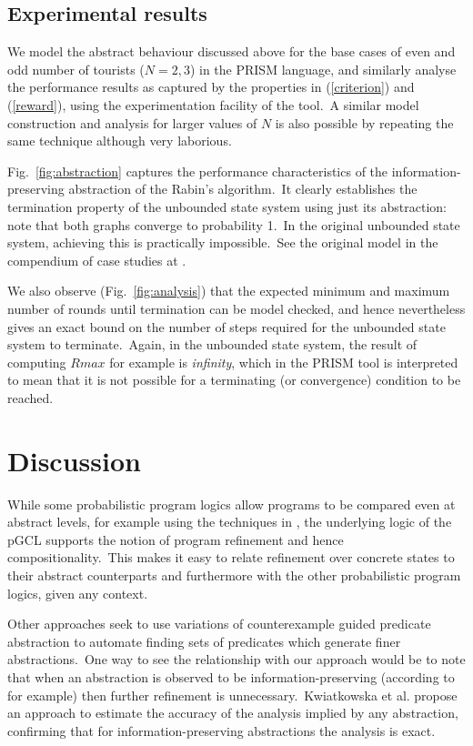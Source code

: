 \documentclass[numbers,copyright,creativecommons]{eptcs}
\newcommand{\figg}[1]{Fig.~\ref{#1}}
\begin{document}
\subsection{Experimental results}
We model the abstract behaviour discussed above for the base cases of even and odd number of tourists ($N = 2,3$) in the PRISM language, and similarly analyse the performance results as captured by the properties in (\ref{criterion}) and (\ref{reward}), using the experimentation facility of the tool.\ A similar model construction and analysis for larger values of $N$ is also possible by repeating the same technique although very laborious.

\figg{fig:abstraction} captures the performance characteristics of the information-preserving abstraction of the Rabin's algorithm.\ It clearly establishes the termination property of the unbounded state system using just its abstraction: note that both graphs converge to probability 1.\ In the original unbounded state system, achieving this is practically impossible.\ See the original model in the compendium of case studies at \cite{PRISM}.

We also observe (\figg{fig:analysis}) that the expected minimum and maximum number of rounds until termination can be model checked, and hence nevertheless gives an exact bound on the number of steps required for the unbounded state system to terminate.\ Again, in the unbounded state system, the result of computing $Rmax$ for example is {\it infinity}, which in the PRISM tool is interpreted to mean that it is not possible for a terminating (or convergence) condition to be reached.

\section{Discussion}

While some probabilistic program logics allow programs to be compared even at abstract levels, for example using the techniques
in \cite{LS91, JS90}, the underlying logic of the pGCL supports the notion of program refinement and hence compositionality.\ This
 makes it easy to relate refinement over concrete states to their abstract counterparts and furthermore with the other 
 probabilistic program logics, given any context.

Other approaches seek to use variations of counterexample guided predicate abstraction \cite{VMCAI,CEGAR} to automate finding sets of predicates which generate finer abstractions.\ One way to see the relationship with our approach would be to note that when an abstraction is observed to be
information-preserving (according to  for example) then further refinement is unnecessary.\ Kwiatkowska et al. \cite{QEST} propose an approach to estimate the accuracy of the analysis implied by any abstraction, confirming that for information-preserving abstractions the analysis is exact.
\end{document}
